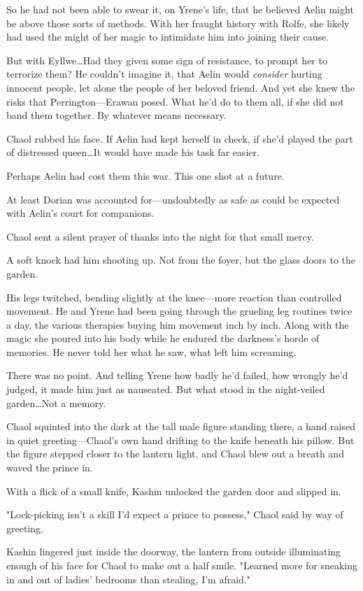 So he had not been able to swear it, on Yrene's life, that he believed Aelin might be above those sorts of methods.
With her fraught history with Rolfe, she likely had used the might of her magic to intimidate him into joining their cause.

But with Eyllwe\ldots Had they given some sign of resistance, to prompt her to terrorize them?
He couldn't imagine it, that Aelin would \emph{consider} hurting innocent people, let alone the people of her beloved friend.
And yet she knew the risks that Perrington---Erawan posed.
What he'd do to them all, if she did not band them together.
By whatever means necessary.

Chaol rubbed his face.
If Aelin had kept herself in check, if she'd played the part of distressed queen\ldots It would have made his task far easier.

Perhaps Aelin had cost them this war.
This one shot at a future.

At least Dorian was accounted for---undoubtedly as safe as could be expected with Aelin's court for companions.

Chaol sent a silent prayer of thanks into the night for that small mercy.

A soft knock had him shooting up.
Not from the foyer, but the glass doors to the garden.

His legs twitched, bending slightly at the knee---more reaction than controlled movement.
He and Yrene had been going through the grueling leg routines twice a day, the various therapies buying him movement inch by inch.
Along with the magic she poured into his body while he endured the darkness's horde of memories.
He never told her what he saw, what left him screaming.

There was no point.
And telling Yrene how badly he'd failed, how wrongly he'd judged, it made him just as nauseated.
But what stood in the night-veiled garden\ldots Not a memory.

Chaol squinted into the dark at the tall male figure standing there, a hand raised in quiet greeting---Chaol's own hand drifting to the knife beneath his pillow.
But the figure stepped closer to the lantern light, and Chaol blew out a breath and waved the prince in.

With a flick of a small knife, Kashin unlocked the garden door and slipped in.

"Lock-picking isn't a skill I'd expect a prince to possess," Chaol said by way of greeting.

Kashin lingered just inside the doorway, the lantern from outside illuminating enough of his face for Chaol to make out a half smile.
"Learned more for sneaking in and out of ladies' bedrooms than stealing, I'm afraid."

